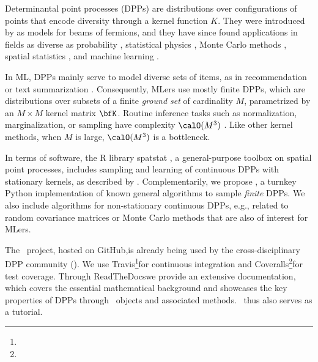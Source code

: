 \documentclass[twoside,11pt]{article}
\begin{document}
    Determinantal point processes (DPPs) are distributions over configurations of points that encode diversity through a kernel function $K$.
    They were introduced by \citet{Mac75} as models for beams of fermions, and they have since found applications in fields as diverse as probability \citep{Sos00, Kon05, HKPV06}, statistical physics \citep{PaBe11}, Monte Carlo methods \citep{BaHa16}, spatial statistics \citep{LaMoRu15}, and machine learning \citep[ML,][]{KuTa12}.

    In ML, DPPs mainly serve to model diverse sets of items, as in recommendation \citep{KaDeKo16, GaPaKo16} or text summarization \citep{DuBa18}.
    Consequently, MLers  use mostly finite DPPs, which are distributions over subsets of a finite \emph{ground set} of cardinality $M$, parametrized by an $M\times M$ kernel matrix $\bfK$.
    Routine inference tasks such as normalization, marginalization, or sampling have complexity $\calO(M^3)$ \citep{Gil14}.
    Like other kernel methods, when $M$ is large, $\calO(M^3)$ is a bottleneck.

    In terms of software, the R library \textsf{spatstat} \citep{BaTu05}, a general-purpose toolbox on spatial point processes, includes sampling and learning of continuous DPPs with stationary kernels, as described by .
    Complementarily, we propose \DPPy, a turnkey Python implementation of known general algorithms to sample \emph{finite} DPPs.
    We also include algorithms for non-stationary continuous DPPs, e.g., related to random covariance matrices or Monte Carlo methods that are also of interest for MLers.

    The \DPPy\ project, hosted on GitHub,\!is already being used by the cross-disciplinary DPP community (\citealp{BuRaWi19,Kam18,Pou19,DeCaVa19,GaBaVa19}).
    We use Travis\!\footnote{\footTravis}for continuous integration and Coveralls\!\footnote{\footCoveralls}for test coverage.
    Through ReadTheDocswe provide an extensive documentation, which covers the essential mathematical background and showcases the key properties of DPPs through \DPPy\ objects and associated methods.
    \DPPy\ thus also serves as a tutorial.
\end{document}
